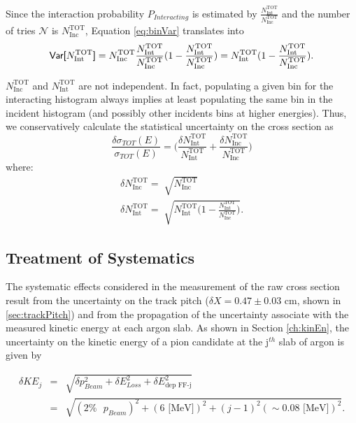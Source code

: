Since the interaction probability $P_{Interacting}$ is estimated by $\frac{ N^{\text{TOT}}_{\text{Int}}}{N^{\text{TOT}}_{\text{Inc}}}$ and the number of tries $\mathcal{N}$ is $N^{\text{TOT}}_{\text{Inc}}$, Equation \ref{eq:binVar} translates into
\begin{equation}
\text{\textsf{Var[}} N^{\text{TOT}}_{\text{Int}} \text{\textsf{]}}
= N^{\text{TOT}}_{\text{Inc}}\frac{ N^{\text{TOT}}_{\text{Int}}}{N^{\text{TOT}}_{\text{Inc}}} (1-\frac{ N^{\text{TOT}}_{\text{Int}}}{N^{\text{TOT}}_{\text{Inc}}}) = N^{\text{TOT}}_{\text{Int}}(1-\frac{ N^{\text{TOT}}_{\text{Int}}}{N^{\text{TOT}}_{\text{Inc}}}). 
\end{equation}

$N^{\text{TOT}}_{\text{Inc}}$ and $N^{\text{TOT}}_{\text{Int}}$ are not independent. In fact, populating a given bin for the interacting histogram always implies at least populating the same bin in the incident histogram  (and possibly other incidents bins at higher energies). Thus, we conservatively calculate the statistical uncertainty on the cross section as 
\begin{equation}
\frac{\delta\sigma_{TOT}(E)}{\sigma_{TOT}(E)} =  \Big(\frac{\delta N^{\text{TOT}}_{\text{Int}}}{N^{\text{TOT}}_{\text{Int}}}+\frac{\delta N^{\text{TOT}}_{\text{Inc}}}{N^{\text{TOT}}_{\text{Inc}}}\Big) 
\end{equation}
where:
\begin{eqnarray}
\delta N^{\text{TOT}}_{\text{Inc}} = \sqrt[]{N^{\text{TOT}}_{\text{Inc}}} \\
\delta N^{\text{TOT}}_{\text{Int}} = \sqrt[]{N^{\text{TOT}}_{\text{Int}}\Big(1-\frac{ N^{\text{TOT}}_{\text{Int}}}{N^{\text{TOT}}_{\text{Inc}}}\Big)}.
\end{eqnarray}



\subsection{Treatment of Systematics} \label{ch:SysUncertaintyXSRaw}
The systematic effects considered in the measurement of the raw cross section result from the uncertainty on the track pitch  ($\delta X = 0.47 \pm 0.03 $ cm, shown in \ref{sec:trackPitch})  and from the propagation of the uncertainty associate with the measured kinetic energy at each argon slab. As shown in Section \ref{ch:kinEn}, the uncertainty on the kinetic energy of a pion candidate at the j$^{th}$ slab of argon  is given by

\begin{eqnarray}
\delta KE_{j} &=& \sqrt{\delta p_{Beam}^2 + \delta E_{Loss}^2 +  \delta  E_{\text{dep FF-j}}^2}\\
&=& \sqrt{(2\% \text{ }p_{Beam})^2 +  ( 6 \text{ [MeV]})^2 +  (j-1)^2 (\sim0.08\text{ [MeV]})^2}.
\end{eqnarray}

